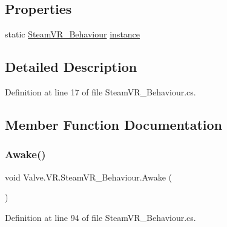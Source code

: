 \subsection*{Properties}
\begin{DoxyCompactItemize}
\item 
static \mbox{\hyperlink{class_valve_1_1_v_r_1_1_steam_v_r___behaviour}{Steam\+V\+R\+\_\+\+Behaviour}} \mbox{\hyperlink{class_valve_1_1_v_r_1_1_steam_v_r___behaviour_ac8b8a5b3919713bd071703b1043d97ab}{instance}}
\end{DoxyCompactItemize}


\subsection{Detailed Description}


Definition at line 17 of file Steam\+V\+R\+\_\+\+Behaviour.\+cs.



\subsection{Member Function Documentation}
\mbox{\label{class_valve_1_1_v_r_1_1_steam_v_r___behaviour_a7c79ea0aa4fe199c0e06dcd33d3b7a94}} 
\subsubsection{\texorpdfstring{Awake()}{Awake()}}
{\footnotesize\ttfamily void Valve.\+V\+R.\+Steam\+V\+R\+\_\+\+Behaviour.\+Awake (\begin{DoxyParamCaption}{ }\end{DoxyParamCaption})\hspace{0.3cm}{\ttfamily [protected]}}



Definition at line 94 of file Steam\+V\+R\+\_\+\+Behaviour.\+cs.

\mbox{\label{class_valve_1_1_v_r_1_1_steam_v_r___behaviour_a827fab8940ddbc45dfe2f0f6f758240c}} 
